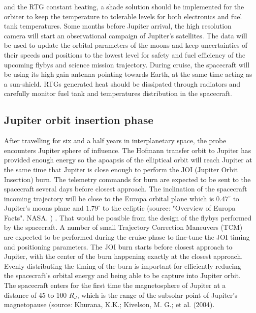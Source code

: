 and the RTG constant heating, a shade solution should be implemented for the orbiter to keep the temperature to tolerable levels for both electronics and fuel tank temperatures. Some months before Jupiter arrival, the high resolution camera will start an observational campaign of Jupiter’s satellites. The data will be used to update the orbital parameters of the moons and keep uncertainties of their speeds and positions to the lowest level for safety and fuel efficiency of the upcoming flybys and science mission trajectory. During cruise, the spacecraft will be using its high gain antenna pointing towards Earth, at the same time acting as a sun-shield. RTGs generated heat should be dissipated through radiators and carefully monitor fuel tank and temperatures distribution in the spacecraft.
\subsection{Jupiter orbit insertion phase}
After travelling for six and a half years in interplanetary space, the probe encounters Jupiter sphere of influence. The Hofmann transfer orbit to Jupiter has provided enough energy so the apoapsis of the elliptical orbit will reach Jupiter at the same time that Jupiter is close enough to perform the JOI (Jupiter Orbit Insertion) burn. The telemetry commands for burn are expected to be sent to the spacecraft several days before closest approach. The inclination of the spacecraft incoming trajectory will be close to the Europa orbital plane which is $0.47^\circ$ to Jupiter’s moons plane and $1.79^\circ$ to the ecliptic (source: "Overview of Europa Facts". NASA. )
. That would be possible from the design of the flybys performed by the spacecraft. A number of small Trajectory Correction Maneuvers (TCM) are expected to be performed during the cruise phase to fine-tune the JOI timing and positioning parameters. The JOI burn starts before closest approach to Jupiter, with the center of the burn happening exactly at the closest approach. Evenly distributing the timing of the burn is important for efficiently reducing the spacecraft’s orbital energy and being able to be capture into Jupiter orbit. The spacecraft enters for the first time the magnetosphere of Jupiter at a distance of 45 to 100 $R_J$, which is the range of the subsolar point of Jupiter’s magnetopause (source: Khurana, K.K.; Kivelson, M. G.; et al. (2004).
